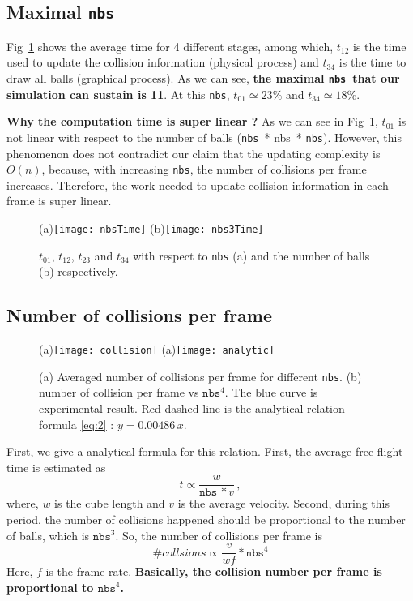 \documentclass[twoside,11pt]{article}
\newcommand{\nbs}{\texttt{nbs}}
\begin{document}
\subsection{Maximal \nbs}
Fig~\ref{fig:time} shows the average time for 4 different stages, among
which, $t_{12}$ is the time used to update the collision information 
(physical process) and $t_{34}$ is the time to draw all balls (graphical
process). As we can see, \textbf{the maximal \nbs\ that our simulation can
sustain is 11}. At this \nbs, $t_{01}\simeq 23\%$ and $t_{34}\simeq 18\%$.

\textbf{Why the computation time is super linear ?} 
As we can see in Fig~\ref{fig:time},  $t_{01}$ is not linear with respect
to the number of balls (\nbs\ * nbs\ * \nbs). However, this phenomenon 
does not contradict 
our claim that the updating complexity is $O(n)$, because, with increasing
\nbs, the number of collisions per frame increases. Therefore, the work
needed to update collision information in each frame is super linear. 

\begin{figure}[h]
  \centering
  (a)\texttt{[image: nbsTime]}
  (b)\texttt{[image: nbs3Time]}
  \caption{$t_{01}$, $t_{12}$, $t_{23}$ and $t_{34}$ with respect to \nbs 
    (a) and the number of balls (b) respectively.}
  \label{fig:time}
\end{figure}


\subsection{Number of collisions per frame}
\begin{figure}[h]
  \centering
  (a)\texttt{[image: collision]}
  (a)\texttt{[image: analytic]}
  \caption{
    (a) Averaged number of collisions per frame for different \nbs.
    (b) number of collision per frame vs $\nbs^4$. The blue curve is
    experimental result. Red dashed line is the analytical relation
    formula \eqref{eq:2} : $ y = 0.00486 \, x$.
  }
  \label{fig:collision}
\end{figure}
First, we give a analytical formula for this 
relation. First, the average free flight time is estimated as 
\begin{equation}
  \label{eq:1}
  t \propto \frac{w}{\nbs\, * v} \,,
\end{equation}
where, $w$ is the cube length and $v$ is the average velocity.
Second, during this period, the number of collisions happened should 
be proportional to the number of balls, which is $\nbs^3$. So, the 
number of collisions per frame is 
\begin{equation}
  \label{eq:2}
  \# collsions \propto \frac{v}{wf} * \nbs^4
\end{equation}
Here, $f$ is the frame rate. 
\textbf{Basically, the collision number per frame is
proportional to $\nbs^4$.}
\end{document}
